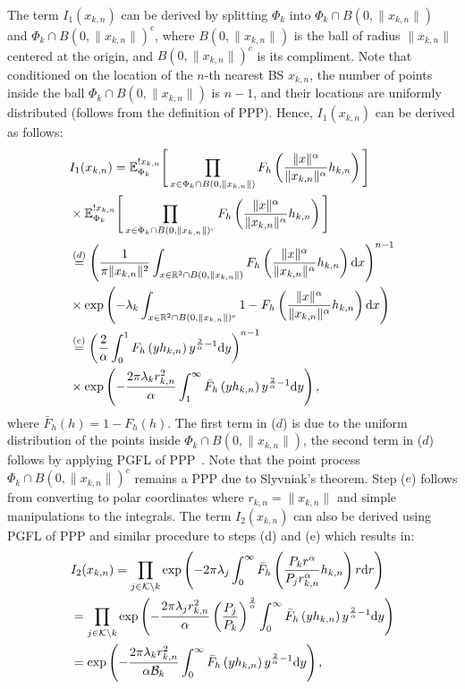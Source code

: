 \documentclass[final]{IEEEtran}
\begin{document}
The term $I_1(x_{k,n})$ can be derived by splitting $\Phi_k$ into $\Phi_k\cap B(0,\|x_{k,n}\|)$ and $\Phi_k\cap B(0,\|x_{k,n}\|)^c$, where $B(0,\|x_{k,n}\|)$ is the ball of radius $\|x_{k,n}\|$ centered at the origin, and $B(0,\|x_{k,n}\|)^c$ is its compliment. Note that conditioned on the location of the $n$-th nearest BS $x_{k,n}$, the number of points inside the ball $\Phi_k\cap B(0,\|x_{k,n}\|)$ is $n-1$, and their locations are uniformly distributed (follows from the definition of PPP). Hence, $I_1(x_{k,n})$ can be derived as follows:
\begin{align}
\label{Eq_I_1}
&I_1(x_{k,n})=\mathbb{E}_{\Phi_k}^{{!x_{k,n}}}\Bigg[\prod_{x\in\Phi_k\cap B(0,\|x_{k,n}\|)}F_h\left(\frac{\|x\|^{\alpha}}{\|x_{k,n}\|^{\alpha}}h_{k,n}\right)\Bigg]\nonumber\\&\times\mathbb{E}_{\Phi_k}^{{!x_{k,n}}}\Bigg[\prod_{x\in\Phi_k\cap B(0,\|x_{k,n}\|)^c}F_h\left(\frac{\|x\|^{\alpha}}{\|x_{k,n}\|^{\alpha}}h_{k,n}\right)\Bigg]\nonumber\\
&\stackrel{(d)}{=}\left(\frac{1}{\pi\|x_{k,n}\|^2}\int_{x\in\mathbb{R}^2\cap B(0,\|x_{k,n}\|)}F_h\left(\frac{\|x\|^{\alpha}}{\|x_{k,n}\|^{\alpha}}h_{k,n}\right){\rm d}x\right)^{n-1}\nonumber\\&\times\exp\left(-\lambda_k\int_{x\in\mathbb{R}^2\cap B(0,\|x_{k,n}\|)^c}1-F_h\left(\frac{\|x\|^{\alpha}}{\|x_{k,n}\|^{\alpha}}h_{k,n}\right){\rm d}x\right)\nonumber\\
&\stackrel{(e)}{=}\left(\frac{2}{\alpha}\int_{0}^{1}F_h\left(yh_{k,n}\right)y^{\frac{2}{\alpha}-1}{\rm d}y\right)^{n-1}\nonumber\\&
\times\exp\left(-\frac{2\pi\lambda_kr_{k,n}^2}{\alpha}\int_{1}^{\infty}\bar{F}_h\left(yh_{k,n}\right)y^{\frac{2}{\alpha}-1}{\rm d}y\right),
\end{align}
where $\bar{F}_h(h)=1-F_h(h)$. The first term in ($d$) is due to the uniform distribution of the points inside $\Phi_k\cap B(0,\|x_{k,n}\|)$, the second term in ($d$) follows by applying PGFL of PPP~\cite{haenggi2012stochastic}. Note that the point process $\Phi_k\cap B(0,\|x_{k,n}\|)^c$ remains a PPP due to Slyvniak's theorem. Step ($e$) follows from converting to polar coordinates where $r_{k,n}=\|x_{k,n}\|$ and simple manipulations to the integrals. The term $I_2(x_{k,n})$ can also be derived using PGFL of PPP and similar procedure to steps (d) and (e) which results in:
\begin{align}
\label{Eq_I_2}
&I_2(x_{k,n})=\prod_{j\in\mathcal{K}\backslash k}\exp\left(-2\pi\lambda_j\int_0^{\infty}\bar{F}_h\left(\frac{P_kr^{\alpha}}{P_jr_{k,n}^{\alpha}}h_{k,n}\right)r{\rm d}r\right)\nonumber\\
&=\prod_{j\in\mathcal{K}\backslash k}\exp\left(-\frac{2\pi\lambda_jr_{k,n}^2}{\alpha}\left(\frac{P_j}{P_k}\right)^{\frac{2}{\alpha}}\int_0^{\infty}\bar{F}_h\left(yh_{k,n}\right)y^{\frac{2}{\alpha}-1}{\rm d}y\right)\nonumber\\
&=\exp\left(-\frac{2\pi\lambda_kr_{k,n}^2}{\alpha\mathcal{B}_k}\int_0^{\infty}\bar{F}_h\left(yh_{k,n}\right)y^{\frac{2}{\alpha}-1}{\rm d}y\right),
\end{align}
\end{document}
